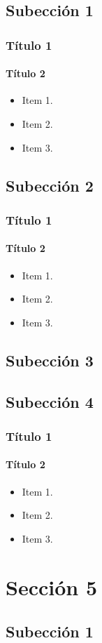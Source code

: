 \documentclass{beamer}
\begin{document}
\subsection{Subección 1}
\begin{frame}
	\frametitle{Título 1}
	\framesubtitle{Título 2}
	\begin{itemize}
		\item Item 1.
		\item Item 2.
		\item Item 3.
	\end{itemize}
\end{frame}
\subsection{Subección 2}
\begin{frame}
	\frametitle{Título 1}
	\framesubtitle{Título 2}
	\begin{itemize}
		\item Item 1.
		\item Item 2.
		\item Item 3.
	\end{itemize}
\end{frame}
\subsection{Subección 3}
\subsection{Subección 4}
\begin{frame}
	\frametitle{Título 1}
	\framesubtitle{Título 2}
	\begin{itemize}
		\item Item 1.
		\item Item 2.
		\item Item 3.
	\end{itemize}
\end{frame}

\section{Sección 5}
\subsection{Subección 1}
\ThankYouFrame
\end{document}
